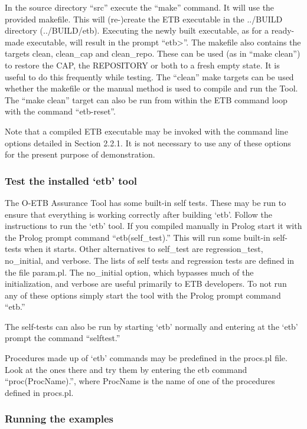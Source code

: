 \documentclass[12pt,twoside,a4paper]{article}
\begin{document}
In the source directory ``src'' execute the ``make'' command. It will use the provided makefile. This will (re-)create the ETB executable in the ../BUILD directory (../BUILD/etb). Executing the newly built executable, as for a ready-made executable, will result in the prompt ``etb\textgreater''. The makefile also contains the targets clean, clean\_cap and clean\_repo. These can be used (as in ``make clean'') to restore the CAP, the REPOSITORY or both to a fresh empty state. It is useful to do this frequently while testing. The ``clean'' make targets can be used whether the makefile or the manual method is used to compile and run the Tool. The ``make clean'' target can also be run from within the ETB command loop with the command ``etb-reset''.

Note that a compiled ETB executable may be invoked with the command line options detailed in Section 2.2.1. It is not necessary to use any of these options for the present purpose of demonstration.

\hypertarget{test-the-installed-etb-tool}{%
\subsubsection{Test the installed `etb' tool}\label{test-the-installed-etb-tool}}

The O-ETB Assurance Tool has some built-in self tests. These may be run to ensure that everything is working correctly after building `etb'. Follow the instructions to run the `etb' tool. If you compiled manually in Prolog start it with the Prolog prompt command ``etb(self\_test).'' This will run some built-in self-tests when it starts. Other alternatives to self\_test are regression\_test, no\_initial, and verbose. The lists of self tests and regression tests are defined in the file param.pl. The no\_initial option, which bypasses much of the initialization, and verbose are useful primarily to ETB developers. To not run any of these options simply start the tool with the Prolog prompt command ``etb.''

The self-tests can also be run by starting `etb' normally and entering at the `etb' prompt the command ``selftest.''

Procedures made up of `etb' commands may be predefined in the procs.pl file. Look at the ones there and try them by entering the etb command ``proc(ProcName).'', where ProcName is the name of one of the procedures defined in procs.pl.

\hypertarget{running-the-examples}{%
\subsubsection{Running the examples}\label{running-the-examples}}
\end{document}
